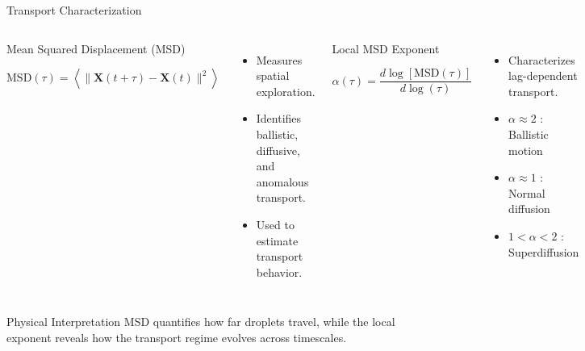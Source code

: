 \begin{frame}{Transport Characterization}

	\begin{columns}[T]


		\begin{block}{Mean Squared Displacement (MSD)}

			\vspace{-0.05cm}

			\[
				\mathrm{MSD}(\tau)
				=
				\left\langle
				\|\mathbf{X}(t+\tau)-\mathbf{X}(t)\|^2
				\right\rangle
			\]

		\end{block}

		\begin{itemize}
			\item Measures spatial exploration.
			\item Identifies ballistic, diffusive, and anomalous transport.
			\item Used to estimate transport behavior.
		\end{itemize}


		\begin{block}{Local MSD Exponent}

			\vspace{-0.05cm}

			\[
				\alpha(\tau)
				=
				\frac{d\log[\mathrm{MSD}(\tau)]}
				{d\log(\tau)}
			\]

		\end{block}

		\begin{itemize}
			\item Characterizes lag-dependent transport.
			\item $\alpha \approx 2$ : Ballistic motion
			\item $\alpha \approx 1$ : Normal diffusion
			\item $1<\alpha<2$ : Superdiffusion
		\end{itemize}

	\end{columns}

	\vspace{0.2cm}

	\begin{alertblock}{Physical Interpretation}
		MSD quantifies how far droplets travel, while the local exponent reveals how the transport regime evolves across timescales.
	\end{alertblock}

\end{frame}
